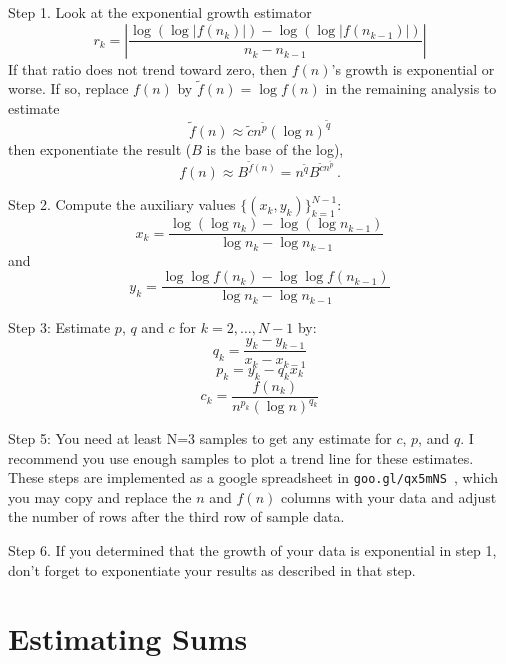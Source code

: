 \documentclass{tufte-handout}
\theoremstyle{definition}
\theoremstyle{example}
\theoremstyle{theorem}
\begin{document}
Step 1.  Look at the exponential growth estimator
\begin{equation}
    r_k=\left| \frac{\log (\log |f(n_k)|)-\log (\log |f(n_{k-1})|)}{n_k-n_{k-1}} \right|
\end{equation}
If that ratio does not trend toward zero, then $f(n)$'s growth is exponential or worse.  If so, replace $f(n)$ by $\tilde{f}(n)=\log f(n)$ in the remaining analysis to estimate
\begin{equation}
    \tilde{f}(n) \approx \tilde{c} n^{\tilde{p}} {(\log n)^{\tilde{q}}}
\end{equation}
then exponentiate the result ($B$ is the base of the log),
\begin{equation}
    f(n) \approx B^{\tilde{f}(n)} = n^{\tilde{q}} B^{\tilde{c} n^{\tilde{p}}} \,.
\end{equation}

Step 2. Compute the auxiliary values $\{ (x_k,y_k) \}_{k=1}^{N-1}$:
\begin{equation}
    x_k = \frac{\log ( \log n_k ) - \log ( \log n_{k-1} )}{\log n_k - \log n_{k-1}}
\end{equation}
and
\begin{equation}
    y_k = \frac{\log \log f(n_k) - \log \log f(n_{k-1})}{\log n_k - \log n_{k-1}}
\end{equation}

Step 3: Estimate $p$, $q$ and $c$ for $k=2,\ldots,N-1$ by:
\begin{equation}
    q_k = \frac{y_k-y_{k-1}}{x_k-x_{k-1}}
\end{equation}
\begin{equation}
    p_k = y_k - q_k x_k
\end{equation}
\begin{equation}
    c_k = \frac{f(n_k)}{n^{p_k} (\log n)^{q_k}}
\end{equation}

Step 5: You need at least N=3 samples to get any estimate for $c$, $p$, and $q$.  I recommend you use enough samples to plot a trend line for these estimates.  These steps are implemented as a google spreadsheet in { \tt goo.gl/qx5mNS }, which you may copy and replace the $n$ and $f(n)$ columns with your data and adjust the number of rows after the third row of sample data.

Step 6. If you determined that the growth of your data is exponential in step 1, don't forget to exponentiate your results as described in that step.


\section{Estimating Sums}
\end{document}
